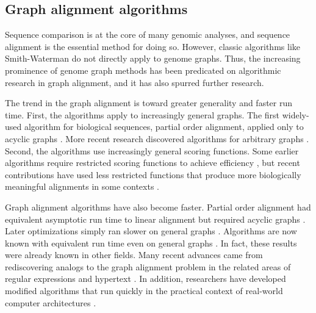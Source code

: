 

%

\subsection{Graph alignment algorithms}

Sequence comparison is at the core of many genomic analyses, and sequence alignment is the essential method for doing so. 
However, classic algorithms like Smith-Waterman \cite{Smith_1981} do not directly apply to genome graphs. 
Thus, the increasing prominence of genome graph methods has been predicated on algorithmic research in graph alignment, and it has also spurred further research.

The trend in the graph alignment is toward greater generality and faster run time. 
First, the algorithms apply to increasingly general graphs. 
The first widely-used algorithm for biological sequences, partial order alignment, applied only to acyclic graphs \cite{Lee_2002, Grasso_2004}. 
More recent research discovered algorithms for arbitrary graphs \cite{Antipov_2015, Rautiainen_2017, Jain_2019a}. 
Second, the algorithms use increasingly general scoring functions. 
Some earlier algorithms require restricted scoring functions to achieve efficiency \cite{Rautiainen_2017}, but recent contributions have used less restricted functions that produce more biologically meaningful alignments in some contexts \cite{Jain_2019a}.

Graph alignment algorithms have also become faster.
Partial order alignment had equivalent asymptotic run time to linear alignment but required acyclic graphs \cite{Lee_2002}. 
Later optimizations simply ran slower on general graphs \cite{Kavya_2019}.
Algorithms are now known with equivalent run time even on general graphs \cite{Jain_2019a}.
In fact, these results were already known in other fields.
Many recent advances came from rediscovering analogs to the graph alignment problem in the related areas of regular expressions and hypertext \cite{Myers_1989, Amir_1997, Navarro_2000}. %
In addition, researchers have developed modified algorithms that run quickly in the practical context of real-world computer architectures \cite{Suzuki_2018, Rautiainen_2019, Jain_2019b}.


